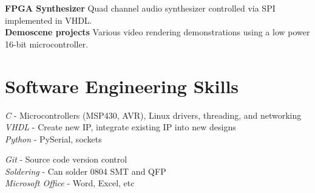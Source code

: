 \documentclass[10pt]{article} %
\begin{document}
\textbf{FPGA Synthesizer} Quad channel audio synthesizer controlled via SPI implemented in VHDL.\\
\smallskip
\textbf{Demoscene projects} Various video rendering demonstrations using a low power 16-bit microcontroller.




\section{Software Engineering Skills}

{
\textit{C} - Microcontrollers (MSP430, AVR), Linux drivers, threading, and networking\\
\textit{VHDL} - Create new IP, integrate existing IP into new designs\\
\textit{Python} - PySerial, sockets
}


{
\textit{Git} - Source code version control\\
\textit{Soldering} - Can solder 0804 SMT and QFP\\
\textit{Microsoft Office} - Word, Excel, etc
}
\end{document}
